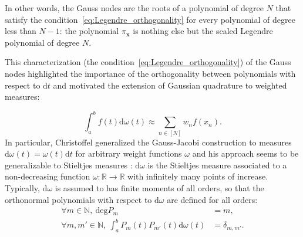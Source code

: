 \documentclass[twoside,11pt]{book}
\begin{document}


 In other words, the Gauss nodes are the roots of a polynomial of degree $N$ that satisfy the condition~\eqref{eq:Legendre_orthogonality} for every polynomial of degree less than $N-1$: the polynomial $\pi_{\bm{x}}$ is nothing else but the scaled Legendre polynomial of degree $N$.



 This characterization (the condition~\eqref{eq:Legendre_orthogonality}) of the Gauss nodes highlighted the importance of the orthogonality between polynomials with respect to $\mathrm{d}t$ and motivated the extension of Gaussian quadrature to weighted measures:

\begin{equation}
\int_{a}^{b}f(t)\mathrm{d}\omega(t) \approx \sum\limits_{n \in [N]} w_{n}f(x_{n}).
\end{equation}
In particular, Christoffel \citep{Chr1877} generalized the Gauss-Jacobi construction to 
measures $\mathrm{d}\omega(t) = \omega(t)\mathrm{d}t$ for arbitrary weight functions $\omega$ and his approach seems to be generalizable to Stieltjes measures \citep{Gau81}: $\mathrm{d}\omega$ is the Stieltjes measure associated to a non-decreasing function $\omega: \mathbb{R} \rightarrow \mathbb{R}$ with infinitely many points of increase. Typically, $\mathrm{d}\omega$ is assumed to has finite moments of all orders, so that the orthonormal polynomials with respect to $\mathrm{d}\omega$ are defined for all orders:
\begin{align}
\forall m \in \mathbb{N}, \: \mathrm{deg} P_{m} & = m, \\
\forall m,m' \in \mathbb{N}, \: \int_{a}^{b} P_{m}(t)P_{m'}(t) \mathrm{d}\omega(t) & = \delta_{m,m'}.
\end{align}
\end{document}
